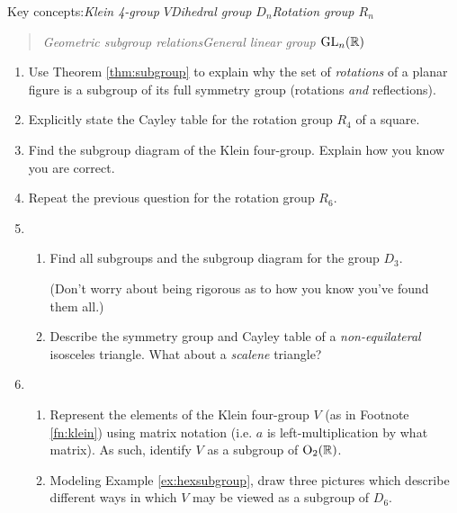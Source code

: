 \vfil


\begin{exercises}
	Key concepts:\quad \emph{Klein 4-group $V$\quad Dihedral group $D_n$\quad Rotation group $R_n$}
	\begin{quote}
		\emph{Geometric subgroup relations\quad General linear group $\mathrm{GL}_n(\mathbb{R})$}
	\end{quote}

	\begin{enumerate}
	 	\item Use Theorem \ref{thm:subgroup} to explain why the set of \emph{rotations} of a planar figure is a subgroup of its full symmetry group (rotations \emph{and} reflections).
	  
	  
	  \item\label{exs:squarerot} Explicitly state the Cayley table for the rotation group $R_4$ of a square.

	  
	  \item Find the subgroup diagram of the Klein four-group. Explain how you know you are correct.
	  
	  
	  \item Repeat the previous question for the rotation group $R_6$. 

		
		\item\begin{enumerate}
		  \item Find all subgroups and the subgroup diagram for the group $D_3$.\par
		  (Don't worry about being rigorous as to how you know you've found them all.)
	    \item Describe the symmetry group and Cayley table of a \emph{non-equilateral} isosceles triangle. What about a \emph{scalene} triangle?
		\end{enumerate}
		
				
	  \goodbreak
	  

	  \item\begin{enumerate}
	    \item Represent the elements of the Klein four-group $V$ (as in Footnote \ref{fn:klein}) using matrix notation (i.e. $a$ is left-multiplication by what matrix). As such, identify $V$ as a subgroup of $\mathrm{O}_2(\mathbb{R})$.
	    \item Modeling Example \ref{ex:hexsubgroup}, draw three pictures which describe different ways in which $V$ may be viewed as a subgroup of $D_6$.
	  \end{enumerate}
	  

\end{enumerate}
\end{exercises}
